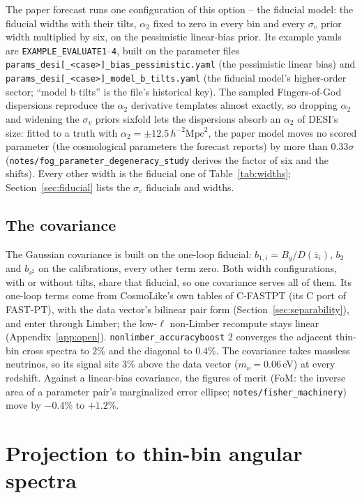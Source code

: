 \documentclass[11pt]{article}
\newcommand{\btwo}{b_2}            %
\newcommand{\bs}{b_{s^2}}          %
\newcommand{\aunit}{\,h^{-2}\mathrm{Mpc}^2}
\begin{document}
The paper forecast runs one configuration of this option -- the
fiducial model: the fiducial widths with their tilts, $\alpha_2$
fixed to zero in every bin and every $\sigma_v$
prior width multiplied by six, on the pessimistic linear-bias prior.
Its example yamls are \texttt{EXAMPLE\_EVALUATE1}--\texttt{4}, built
on the parameter files
\texttt{params\_desi[\_<case>]\_bias\_pessimistic.yaml} (the
pessimistic linear bias) and
\texttt{params\_desi[\_<case>]\_model\_b\_tilts.yaml} (the fiducial
model's higher-order sector; ``model b tilts'' is the file's
historical key).
The sampled Fingers-of-God
dispersions reproduce the $\alpha_2$ derivative templates almost
exactly, so dropping $\alpha_2$ and widening the $\sigma_v$ priors
sixfold lets the dispersions absorb an $\alpha_2$ of DESI's size:
fitted to a truth with $\alpha_2 = \pm12.5\aunit$, the paper model
moves no scored parameter (the cosmological parameters the forecast
reports) by more than $0.33\sigma$
(\texttt{notes/fog\_parameter\_degeneracy\_study} derives the factor
of six and the shifts).  Every other width is the fiducial one of
Table~\ref{tab:widths}; Section~\ref{sec:fiducial} lists the
$\sigma_v$ fiducials and widths.

\subsection{The covariance}
\label{sec:covariance}

The Gaussian covariance is built on the one-loop fiducial:
$b_{1,i} = B_g/D(\bar{z}_i)$, $\btwo$ and $\bs$ on the calibrations,
every other term zero.  Both width configurations, with or without
tilts, share
that fiducial, so one covariance serves all of them.  Its one-loop terms come from CosmoLike's own
tables of C-FASTPT (its C port of FAST-PT), with the data vector's
bilinear pair form
(Section~\ref{sec:separability}), and enter through Limber; the low-$\ell$
non-Limber recompute stays linear (Appendix~\ref{app:open}).
\texttt{nonlimber\_accuracyboost} 2 converges the adjacent thin-bin
cross spectra to $2\%$ and the diagonal to $0.4\%$.  The covariance
takes massless neutrinos, so its signal sits $3\%$ above the data
vector ($m_\nu = 0.06$\,eV) at every redshift.  Against a linear-bias
covariance, the figures of merit (FoM: the inverse area of a parameter
pair's marginalized error ellipse; \texttt{notes/fisher\_machinery})
move by $-0.4\%$ to $+1.2\%$.

\section{Projection to thin-bin angular spectra}
\label{sec:projection}
\end{document}
